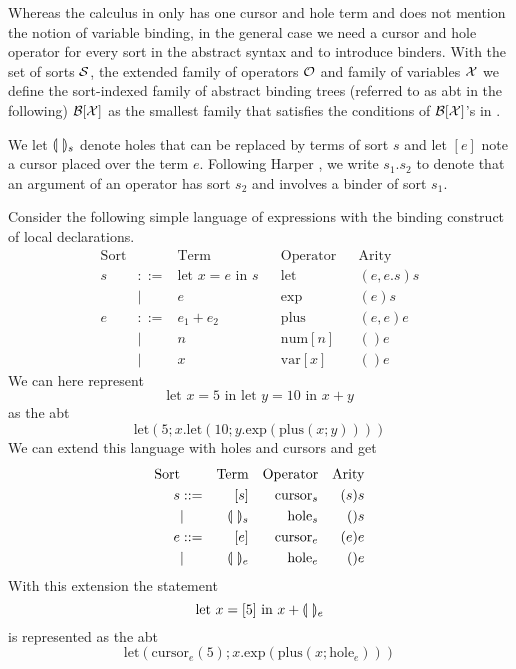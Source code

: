 \documentclass[sigplan]{acmart}
\newcommand{\abt}{\textsf{abt}\xspace}
\begin{document}
Whereas the calculus in \cite{type_safe_structure_editor} only has one
cursor and hole term and does not mention the notion of variable
binding, in the general case we need a cursor and hole operator for
every sort in the abstract syntax and to introduce binders.  With the
set of sorts $\mathcal{S}$, the extended family of operators $\mathcal{O}$ and
family of variables $\mathcal{X}$ we define the sort-indexed family of
abstract binding trees (referred to as \abt in the following) $\mathcal{B}[\mathcal{X} ]$
as the smallest family that satisfies the conditions of $\mathcal{B}[\mathcal{X} ]$'s in
\cite{harper_foundations}.

We let $\llparenthesis \ \rrparenthesis_s$ denote holes that can be replaced by terms of sort
$s$ and let $[e]$ note a cursor placed over the term $e$. Following
Harper \cite{harper_foundations}, we write $s_1.s_2$ to denote that an
argument of an operator has sort $s_2$ and involves a binder of sort
$s_1$.

\begin{example}\label{ex:abstract_syntax}
Consider the following simple language of expressions with the binding
construct of local declarations.
\begin{align*}
  \text{Sort} && \text{Term} && \text{Operator} && \text{Arity} \\
        s & ::= & \text{let $x = e$ in $s$} && \text{let} && (e, e.s)s \\
        & | & e && \text{exp} && (e)s \\
  e & ::= & e_1 + e_2 && \text{plus} && (e,e)e \\
        & | & n && \text{num}[n] &&  ()e \\
        & | & x && \text{var}[x] && ()e
\end{align*}
 We can here represent
    \begin{equation*}
        \text{let $x=5$ in let $y=10$ in $x+y$}
    \end{equation*}
    as the \abt
    \begin{equation*}
        \text{let}(5;x.\text{let}(10;y.\text{exp}(\text{plus}(x;y))))
    \end{equation*}
%
    We can extend this language with holes and cursors and get
\begin{align*}
        \text{Sort} && \text{Term} && \text{Operator} && \text{Arity} \\
        s & ::= & [s] && \text{cursor}_s && (s)s \\
        & | & \llparenthesis \ \rrparenthesis_s && \text{hole}_s && ()s \\
        e & ::= & [e] && \text{cursor}_e && (e)e \\
        & | & \llparenthesis \ \rrparenthesis_e && \text{hole}_e && ()e
 \end{align*}
%
    With this extension the statement
    \begin{equation*}
        \text{let $x=[5]$ in $x+\llparenthesis \ \rrparenthesis_e$}
    \end{equation*}
    is represented as the \abt
    \begin{equation*}
        \text{let}(\text{cursor}_e(5); x.\text{exp}(\text{plus}(x;\text{hole}_e)))
    \end{equation*}
\end{example}
\end{document}
